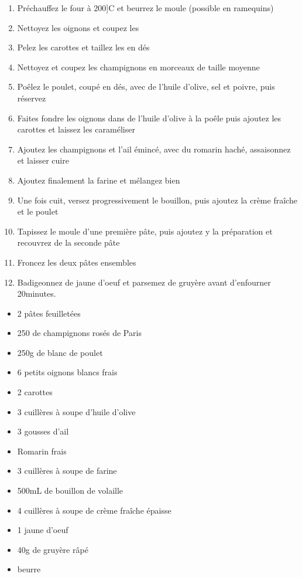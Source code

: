     \begin{minipage}{.7\textwidth}
        \begin{enumerate}
            \item Préchauffez le four à 200]C et beurrez le moule (possible en ramequins)
	    \item Nettoyez les oignons et coupez les
	    \item Pelez les carottes et taillez les en dés
	    \item Nettoyez et coupez les champignons en morceaux de taille moyenne
	    \item Poêlez le poulet, coupé en dés, avec de l'huile d'olive, sel et poivre, puis réservez
	    \item Faites fondre les oignons dans de l'huile d'olive à la poêle puis ajoutez les carottes et laissez les caraméliser
	    \item Ajoutez les champignons et l'ail émincé, avec du romarin haché, assaisonnez et laisser cuire
	    \item Ajoutez finalement la farine et mélangez bien
	    \item Une fois cuit, versez progressivement le bouillon, puis ajoutez la crème fraîche et le poulet
	    \item Tapissez le moule d'une première pâte, puis ajoutez y la préparation et recouvrez de la seconde pâte
	    \item Froncez les deux pâtes ensembles
	    \item Badigeonnez de jaune d'oeuf et parsemez de gruyère avant d'enfourner 20minutes.

        \end{enumerate}
    \end{minipage}
    \begin{minipage}{.3\textwidth}
        \begin{flushleft}
        \begin{itemize}
            \item 2 pâtes feuilletées
	    \item 250 de champignons rosés de Paris
	    \item 250g de blanc de poulet
	    \item 6 petits oignons blancs frais
	    \item 2 carottes
	    \item 3 cuillères à soupe d'huile d'olive
	    \item 3 gousses d'ail
	    \item Romarin frais
	    \item 3 cuillères à soupe de farine
	    \item 500mL de bouillon de volaille
	    \item 4 cuillères à soupe de crème fraîche épaisse
	    \item 1 jaune d'oeuf
	    \item 40g de gruyère râpé
	    \item beurre

        \end{itemize}
        \end{flushleft}
    \end{minipage}
    

